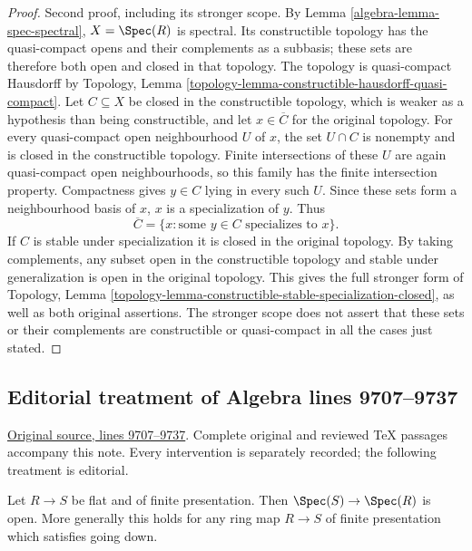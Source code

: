 \begin{proof}
\medskip\noindent
Second proof, including its stronger scope. By
Lemma \ref{algebra-lemma-spec-spectral}, $X=\Spec(R)$ is
spectral. Its constructible topology has the
quasi-compact opens and their complements as a
subbasis; these sets are therefore both open and
closed in that topology. The topology is
quasi-compact Hausdorff by Topology, Lemma
\ref{topology-lemma-constructible-hausdorff-quasi-compact}.
Let $C\subseteq X$ be closed in the constructible
topology, which is weaker as a hypothesis than
being constructible, and let $x\in\overline C$
for the original topology. For every quasi-compact
open neighbourhood $U$ of $x$, the set $U\cap C$
is nonempty and is closed in the constructible
topology. Finite intersections of these $U$ are
again quasi-compact open neighbourhoods, so this
family has the finite intersection property.
Compactness gives $y\in C$ lying in every such $U$.
Since these sets form a neighbourhood basis of $x$,
$x$ is a specialization of $y$. Thus
$$
\overline C=\{x:\text{some }y\in C\text{ specializes to }x\}.
$$
If $C$ is stable under specialization it is closed
in the original topology. By taking complements,
any subset open in the constructible topology
and stable under generalization is open in the
original topology. This gives the full stronger
form of Topology, Lemma
\ref{topology-lemma-constructible-stable-specialization-closed},
as well as both original assertions. The stronger
scope does not assert that these sets or their
complements are constructible or quasi-compact in
all the cases just stated.
\end{proof}


\subsection{Editorial treatment of Algebra lines 9707--9737}

\hypertarget{algebra-context-111}{}

\noindent\href{https://github.com/stacks/stacks-project/blob/a04446e57ec1fbc252a871afcec7752fb2807b14/algebra.tex\#L9707}{Original source, lines 9707--9737}. Complete original and reviewed TeX passages accompany this note. Every intervention is separately recorded; the following treatment is editorial.


\begin{proposition}
\label{editorial-source-proposition-fppf-open}
Let $R \to S$ be flat and of finite presentation.
Then $\Spec(S) \to \Spec(R)$ is open.
More generally this holds for any ring map $R \to S$ of
finite presentation which satisfies going down.
\end{proposition}


